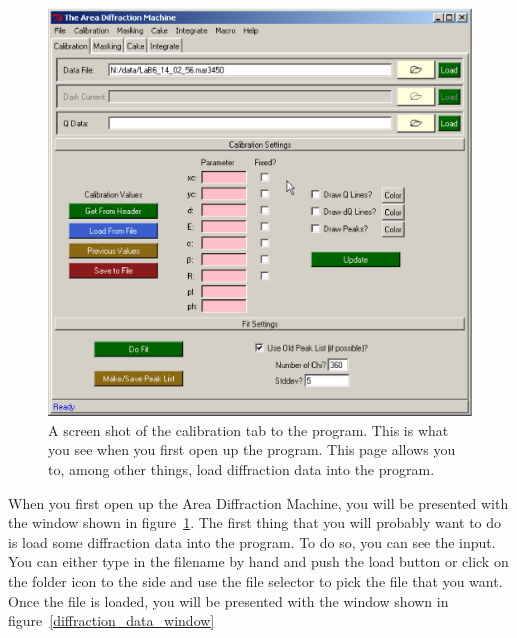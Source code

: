 
\begin{figure}
    \centering
    \includegraphics[scale=.75]{figures/calibration_page.eps}
    \caption{A screen shot of the calibration tab to the program.
    This is what you see when you first open up the program. 
    This page allows you to, among other things, load diffraction
    data into the program.} 
    \label{calibration_page}
\end{figure}



When you first open up the Area Diffraction Machine, you
will be presented with the window shown in 
figure~\ref{calibration_page}. The first thing that you
will probably want to do is load some diffraction data into
the program. To do so, you can see the  input.
You can either type in the filename by hand and push the
load button or click on the folder icon to the side and
use the file selector to pick the file that you want.
Once the file is loaded, you will be presented with
the window shown in figure~\ref{diffraction_data_window}

